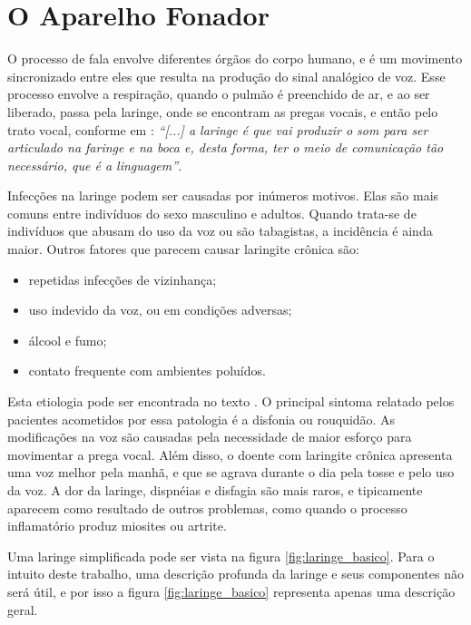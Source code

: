 \documentclass[a4paper,12pt,oneside]{report}
\begin{document}
\section {O Aparelho Fonador}
\hspace*{+15pt} O processo de fala envolve diferentes \'{o}rg\~{a}os do corpo humano, e \'{e} um movimento sincronizado entre eles que resulta na produ\c{c}\~{a}o do sinal anal\'{o}gico de voz. Esse processo envolve a respira\c{c}\~{a}o, quando o pulm\~{a}o \'{e} preenchido de ar, e ao ser liberado, passa pela laringe, onde se encontram as pregas vocais, e ent\~{a}o pelo trato vocal, conforme em \cite{livro_laringe_henrique}: \textit{``[...] a laringe \'{e} que vai produzir o som para ser articulado na faringe e na boca e, desta forma, ter o meio de comunica\c{c}\~{a}o t\~{a}o necess\'{a}rio, que \'{e} a linguagem''}.  
\\
\par Infec\c{c}\~{o}es na laringe podem ser causadas por in\'{u}meros motivos. Elas s\~{a}o mais comuns entre indiv\'{i}duos do sexo masculino e adultos. Quando trata-se de indiv\'{i}duos que abusam do uso da voz ou s\~{a}o tabagistas, a incid\^{e}ncia \'{e} ainda maior. Outros fatores que parecem causar laringite cr\^{o}nica s\~{a}o:
\begin{itemize}[noitemsep]
\item repetidas infec\c{c}\~{o}es de vizinhan\c{c}a;
\item uso indevido da voz, ou em condi\c{c}\~{o}es adversas;
\item \'{a}lcool e fumo;
\item contato frequente com ambientes polu\'{i}dos.
\end{itemize}
Esta etiologia pode ser encontrada no texto \cite{livro_laringe_henrique}. O principal sintoma relatado pelos pacientes acometidos por essa patologia \'{e} a disfonia ou rouquid\~{a}o. As modifica\c{c}\~{o}es na voz s\~{a}o causadas pela necessidade de maior esfor\c{c}o para movimentar a prega vocal. Al\'{e}m disso, o doente com laringite cr\^{o}nica apresenta uma voz melhor pela manh\~{a}, e que se agrava durante o dia pela tosse e pelo uso da voz. A dor da laringe, dispn\'{e}ias e disfagia s\~{a}o mais raros, e tipicamente aparecem como resultado de outros problemas, como quando o processo inflamat\'{o}rio produz miosites ou artrite\cite{the_larynx}.
\\
\par Uma laringe simplificada pode ser vista na figura \ref{fig:laringe_basico}. Para o intuito deste trabalho, uma descri\c{c}\~{a}o profunda da laringe e seus componentes n\~{a}o ser\'{a} \'{u}til, e por isso a figura \ref{fig:laringe_basico} representa apenas uma descri\c{c}\~{a}o geral. 
\end{document}
